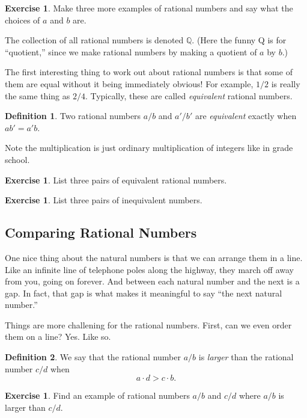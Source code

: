 \documentclass[12pt,letterpaper]{article}
\theoremstyle{definition}
\newtheorem{exercise}[question]{Exercise}
\newtheorem*{definition}{Definition}
\begin{document}
\begin{exercise}
Make three more examples of rational numbers and say what the choices of $a$ and $b$ are.
\end{exercise}

The collection of all rational numbers is denoted $\mathbb{Q}$. 
(Here the funny Q is for ``quotient,'' since we make rational numbers by making a quotient of $a$ by $b$.)

The first interesting thing to work out about rational numbers is that some of them are equal without it being immediately obvious!
For example, $1/2$ is really the same thing as $2/4$.
Typically, these are called \emph{equivalent} rational numbers. 

\begin{definition} Two rational numbers $a/b$ and $a'/b'$ are \emph{equivalent} exactly when 
$ab' = a'b$.
\end{definition}
Note the multiplication is just ordinary multiplication of integers like in grade school.


\begin{exercise}
List three pairs of equivalent rational numbers.
\end{exercise}

\begin{exercise}
List three pairs of inequivalent numbers.
\end{exercise}

\subsection*{Comparing Rational Numbers}

One nice thing about the natural numbers is that we can arrange them in a line.
Like an infinite line of telephone poles along the highway, they march off away from you, going on forever.
And between each natural number and the next is a gap.
In fact, that gap is what makes it meaningful to say ``the next natural number.''

Things are more challening for the rational numbers.
First, can we even order them on a line?
Yes. 
Like so.

\begin{definition}
We say that the rational number $a/b$ is \emph{larger} than the rational number $c/d$ when 
\[
a \cdot d > c \cdot b.
\]
\end{definition}

\begin{exercise}
Find an example of rational numbers $a/b$ and $c/d$ where $a/b$ is larger than $c/d$.
\end{exercise}
\end{document}
